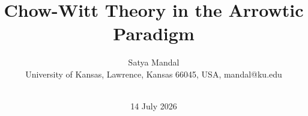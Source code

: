 \documentclass[12pt]{article}
\title{Chow-Witt Theory in the Arrowtic Paradigm} %
\author{
 Satya Mandal \\ {\small University of Kansas,  Lawrence, Kansas 66045, USA,  mandal@ku.edu}\\
\TCP{\bf ArrowticKTheory.com}\\
 }
\begin{document}
%

\setcounter{page}{0}

%
\renewcommand{\baselinestretch}{1.255}
\setlength{\parskip}{1ex plus0.5ex}
\date{14 July 2026} %
%
%
\newcommand{\iso}{\stackrel{\sim}{\longrightarrow}}
\newcommand{\sur}{\twoheadrightarrow}

\newcommand{\eop}{\hfill{\TCP{\rule{2mm}{2mm}}}}
\newcommand{\pf}{\noindent{\bf Proof.~}}
\newcommand{\outlinePf}{\noindent{\bf Outline of the Proof.~}}

\newcommand{\PD}{\dim_{{\SA}}}
\newcommand{\PDV}{\dim_{{\SV}}}

\newcommand{\ra}{\rightarrow}
\newcommand{\lra}{\longrightarrow}
\newcommand{\hra}{\hookrightarrow} 
\newcommand{\Lra}{\Longrightarrow}
\newcommand{\Lla}{\Longleftarrow}
\newcommand{\Llra}{\Longleftrightarrow}
\newcommand{\llra}{\longleftrightarrow} 
\newcommand{\ora}{\overrightarrow}


\newcommand{\pic}{The proof is complete.~}
\newcommand{\Sp}{\mathrm{Sp}}
\newcommand{\BiSp}{\mathrm{BiSp}}
\newcommand{\colim}{\mathrm{colim}}
\newcommand{\codim}{\mathrm{co}\dim}
\newcommand{\coh}{\mathrm{Coh}}
\newcommand{\qcoh}{\mathrm{QCoh}}



\newcommand{\bul}{\bullet}


\newcommand{\bE}{\begin{enumerate}}
\newcommand{\eE}{\end{enumerate}}

\newtheorem{theorem}{Theorem}[section]
\newtheorem{proposition}[theorem]{Proposition}
\newtheorem{lemma}[theorem]{Lemma}
\newtheorem{definition}[theorem]{Definition}
\newtheorem{corollary}[theorem]{Corollary}
\newtheorem{construction}[theorem]{Construction}
\newtheorem{notation}[theorem]{Notation}
\newtheorem{notations}[theorem]{Notations}
\newtheorem{remark}[theorem]{Remark}
\newtheorem{question}[theorem]{Question}
\newtheorem{example}[theorem]{Example} 
\newtheorem{examples}[theorem]{Examples} 
\newtheorem{exercise}[theorem]{Exercise} 
\newtheorem{setup}[theorem]{Setup} 
\newtheorem{openProblem}[theorem]{Open Problem} 
\newtheorem{clarification}[theorem]{Clarification} 




\newtheorem{problem}[theorem]{Problem} 
\newtheorem{conjecture}[theorem]{Conjecture} 
\end{document}
